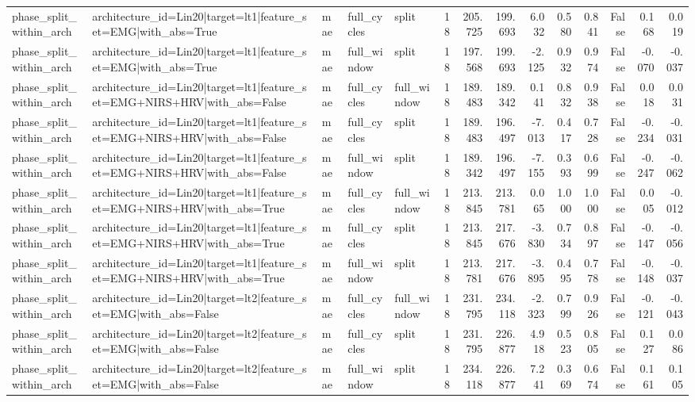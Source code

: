\begin{table}
\begin{tabular}{lllllrrrrrrrrr}
phase_split_within_arch & architecture_id=Lin20|target=lt1|feature_set=EMG|with_abs=True & mae & full_cycles & split & 18 & 205.725 & 199.693 & 6.032 & 0.580 & 0.841 & False & 0.168 & 0.019 \\
phase_split_within_arch & architecture_id=Lin20|target=lt1|feature_set=EMG|with_abs=True & mae & full_window & split & 18 & 197.568 & 199.693 & -2.125 & 0.932 & 0.974 & False & -0.070 & -0.037 \\
phase_split_within_arch & architecture_id=Lin20|target=lt1|feature_set=EMG+NIRS+HRV|with_abs=False & mae & full_cycles & full_window & 18 & 189.483 & 189.342 & 0.141 & 0.832 & 0.938 & False & 0.018 & 0.031 \\
phase_split_within_arch & architecture_id=Lin20|target=lt1|feature_set=EMG+NIRS+HRV|with_abs=False & mae & full_cycles & split & 18 & 189.483 & 196.497 & -7.013 & 0.417 & 0.728 & False & -0.234 & -0.031 \\
phase_split_within_arch & architecture_id=Lin20|target=lt1|feature_set=EMG+NIRS+HRV|with_abs=False & mae & full_window & split & 18 & 189.342 & 196.497 & -7.155 & 0.393 & 0.699 & False & -0.247 & -0.062 \\
phase_split_within_arch & architecture_id=Lin20|target=lt1|feature_set=EMG+NIRS+HRV|with_abs=True & mae & full_cycles & full_window & 18 & 213.845 & 213.781 & 0.065 & 1.000 & 1.000 & False & 0.005 & -0.012 \\
phase_split_within_arch & architecture_id=Lin20|target=lt1|feature_set=EMG+NIRS+HRV|with_abs=True & mae & full_cycles & split & 18 & 213.845 & 217.676 & -3.830 & 0.734 & 0.897 & False & -0.147 & -0.056 \\
phase_split_within_arch & architecture_id=Lin20|target=lt1|feature_set=EMG+NIRS+HRV|with_abs=True & mae & full_window & split & 18 & 213.781 & 217.676 & -3.895 & 0.495 & 0.778 & False & -0.148 & -0.037 \\
phase_split_within_arch & architecture_id=Lin20|target=lt2|feature_set=EMG|with_abs=False & mae & full_cycles & full_window & 18 & 231.795 & 234.118 & -2.323 & 0.799 & 0.926 & False & -0.121 & -0.043 \\
phase_split_within_arch & architecture_id=Lin20|target=lt2|feature_set=EMG|with_abs=False & mae & full_cycles & split & 18 & 231.795 & 226.877 & 4.918 & 0.523 & 0.805 & False & 0.127 & 0.086 \\
phase_split_within_arch & architecture_id=Lin20|target=lt2|feature_set=EMG|with_abs=False & mae & full_window & split & 18 & 234.118 & 226.877 & 7.241 & 0.369 & 0.674 & False & 0.161 & 0.105 \\

\end{tabular}
\end{table}
